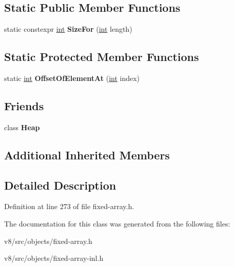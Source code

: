 \subsection*{Static Public Member Functions}
\begin{DoxyCompactItemize}
\item 
\mbox{\label{classv8_1_1internal_1_1WeakFixedArray_ac61e20b5de23cfd9ed069ba84d1b0676}} 
static constexpr \mbox{\hyperlink{classint}{int}} {\bfseries Size\+For} (\mbox{\hyperlink{classint}{int}} length)
\end{DoxyCompactItemize}
\subsection*{Static Protected Member Functions}
\begin{DoxyCompactItemize}
\item 
\mbox{\label{classv8_1_1internal_1_1WeakFixedArray_af71bc3ee409659984d5e54affa6f6d60}} 
static \mbox{\hyperlink{classint}{int}} {\bfseries Offset\+Of\+Element\+At} (\mbox{\hyperlink{classint}{int}} index)
\end{DoxyCompactItemize}
\subsection*{Friends}
\begin{DoxyCompactItemize}
\item 
\mbox{\label{classv8_1_1internal_1_1WeakFixedArray_a3d69975be2e998e7bf2dcd1b1c8b4577}} 
class {\bfseries Heap}
\end{DoxyCompactItemize}
\subsection*{Additional Inherited Members}


\subsection{Detailed Description}


Definition at line 273 of file fixed-\/array.\+h.



The documentation for this class was generated from the following files\+:\begin{DoxyCompactItemize}
\item 
v8/src/objects/fixed-\/array.\+h\item 
v8/src/objects/fixed-\/array-\/inl.\+h\end{DoxyCompactItemize}
